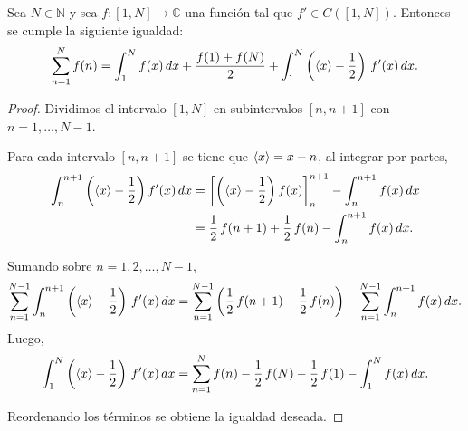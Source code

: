 \begin{proposition}
    Sea $N \in \mathbb{N}$ y sea $f:[1,N] \to \mathbb{C}$ una función tal que $f' \in C([1,N])$. 
    Entonces se cumple la siguiente igualdad:
    \begin{align}
        \label{prop:formula_euler}
        \sum_{n=1}^N f(n) = 
        \int_1^N f(x) \, dx + 
        \frac{f(1)+f(N)}{2} + 
        \int_1^N \left(\langle x \rangle - \frac{1}{2}\right) \, f'(x) \, dx.
    \end{align}
\end{proposition}

\begin{proof}
    Dividimos el intervalo $[1,N]$ en subintervalos $[n,n+1]$ con $n=1,\ldots,N-1$. 
    
    Para cada intervalo $[n,n+1]$ se tiene que $\langle x \rangle = x - n$, 
    al integrar por partes,
    \begin{align*} 
        \int_n^{n+1} \left(\langle x \rangle - \frac{1}{2}\right) f'(x) \, dx 
        &= \left[\left(\langle x \rangle - \frac{1}{2}\right) f(x) \right]_n^{n+1} - \int_n^{n+1} f(x) \, dx \\
        &= \frac{1}{2} \, f(n+1) + \frac{1}{2} \, f(n) - \int_n^{n+1} f(x) \, dx.
    \end{align*}

    Sumando sobre $n=1,2,\ldots,N-1$,
    \[
        \sum_{n=1}^{N-1} \int_n^{n+1} \left(\langle x \rangle - \frac{1}{2}\right) \, f'(x) \, dx =
        \sum_{n=1}^{N-1} \left(\frac{1}{2} \, f(n+1) + \frac{1}{2} \, f(n)\right) -
        \sum_{n=1}^{N-1} \int_n^{n+1} f(x) \, dx.
    \]
    Luego,
    \[
        \int_1^N \left(\langle x \rangle - \frac{1}{2}\right) \, f'(x) \, dx =
        \sum_{n=1}^N f(n) - \frac{1}{2} \, f(N) - \frac{1}{2} \, f(1) - 
        \int_1^N f(x) \, dx.
    \]
    
    Reordenando los términos se obtiene la igualdad deseada.
\end{proof}